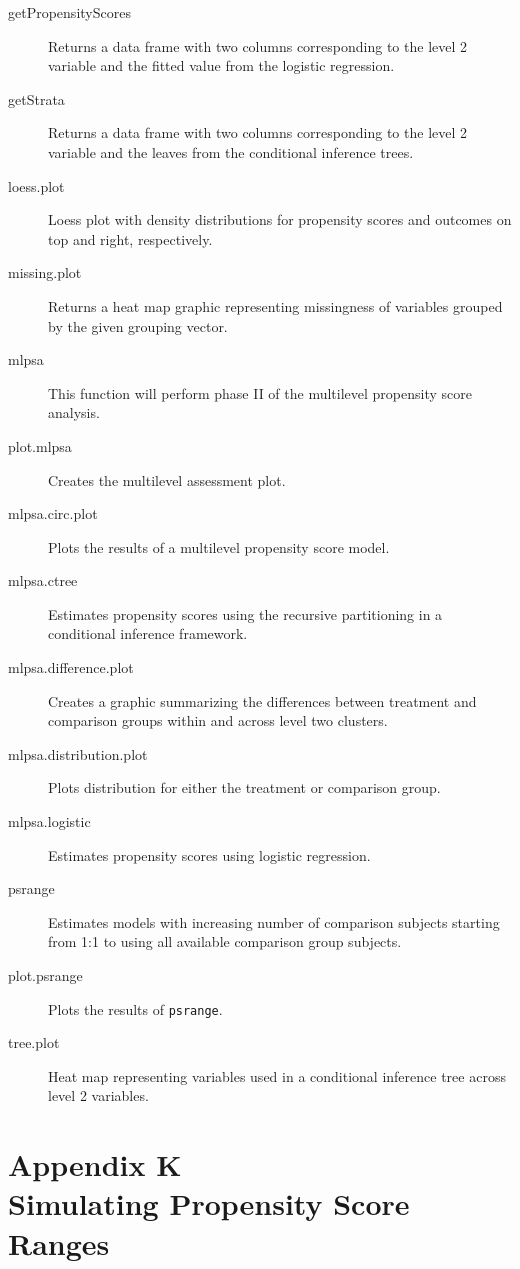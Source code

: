 \renewcommand{\descriptionlabel}[1]{\hspace{\labelsep}\textbf{\texttt{#1}}}
\begin{description}
\item[getPropensityScores] Returns a data frame with two columns corresponding to the level 2 variable and the fitted value from the logistic regression.
\item[getStrata] Returns a data frame with two columns corresponding to the level 2 variable and the leaves from the conditional inference trees.
\item[loess.plot] Loess plot with density distributions for propensity scores and outcomes on top and right, respectively.
\item[missing.plot] Returns a heat map graphic representing missingness of variables grouped by the given grouping vector.
\item[mlpsa] This function will perform phase II of the multilevel propensity score analysis.
\item[plot.mlpsa] Creates the multilevel assessment plot.
\item[mlpsa.circ.plot] Plots the results of a multilevel propensity score model.
\item[mlpsa.ctree] Estimates propensity scores using the recursive partitioning in a conditional inference framework.
\item[mlpsa.difference.plot] Creates a graphic summarizing the differences between treatment and comparison groups within and across level two clusters.
\item[mlpsa.distribution.plot] Plots distribution for either the treatment or comparison group.
\item[mlpsa.logistic] Estimates propensity scores using logistic regression.
\item[psrange] Estimates models with increasing number of comparison subjects starting from 1:1 to using all available comparison group subjects.
\item[plot.psrange] Plots the results of \texttt{psrange}.
\item[tree.plot] Heat map representing variables used in a conditional inference tree across level 2 variables.
\end{description}

\clearpage
{}
\section*{Appendix K\\Simulating Propensity Score Ranges}
\label{appendixK}

